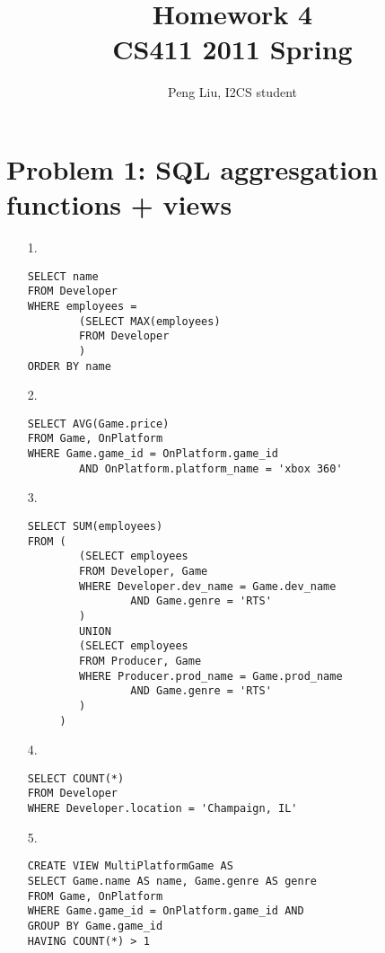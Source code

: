 \documentclass[letter,11pt]{article}
\author{Peng Liu, I2CS student}
\title{Homework 4\\CS411 2011 Spring}
\begin{document}
\lstset{language=SQL}
\maketitle

\section*{Problem 1: SQL aggresgation functions + views}

\begin{enumerate}
\item[1.] 

\begin{verbatim}
SELECT name
FROM Developer
WHERE employees =
        (SELECT MAX(employees)
        FROM Developer
        )
ORDER BY name
\end{verbatim}

\item[2.] 

\begin{verbatim}
SELECT AVG(Game.price)
FROM Game, OnPlatform
WHERE Game.game_id = OnPlatform.game_id
        AND OnPlatform.platform_name = 'xbox 360'
\end{verbatim}

\item[3.]
 
\begin{verbatim}
SELECT SUM(employees)
FROM (
        (SELECT employees
        FROM Developer, Game
        WHERE Developer.dev_name = Game.dev_name
                AND Game.genre = 'RTS'
        )
        UNION
        (SELECT employees
        FROM Producer, Game
        WHERE Producer.prod_name = Game.prod_name
                AND Game.genre = 'RTS'
        )
     )
\end{verbatim}

\item[4.]

\begin{verbatim}
SELECT COUNT(*)
FROM Developer
WHERE Developer.location = 'Champaign, IL'
\end{verbatim}

\item[5.]

\begin{verbatim}
CREATE VIEW MultiPlatformGame AS
SELECT Game.name AS name, Game.genre AS genre
FROM Game, OnPlatform
WHERE Game.game_id = OnPlatform.game_id AND
GROUP BY Game.game_id
HAVING COUNT(*) > 1
\end{verbatim}

\end{enumerate}
\end{document}
